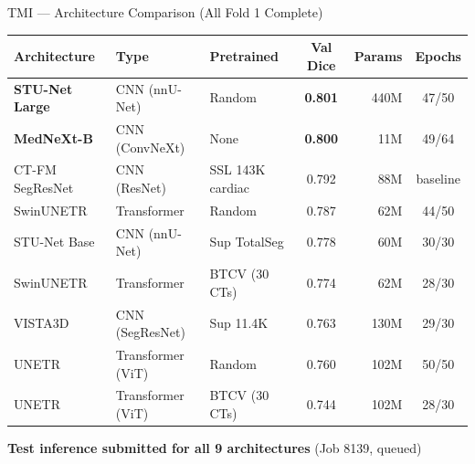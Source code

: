 \documentclass[aspectratio=169,10pt]{beamer}
\newcommand{\good}[1]{\textcolor{green!60!black}{\textbf{#1}}}
\newcommand{\bad}[1]{\textcolor{red!70!black}{#1}}
\begin{document}
\begin{frame}{TMI --- Architecture Comparison (All Fold 1 Complete)}

\centering
\scriptsize
\begin{tabular}{l l l c r c}
\toprule
\textbf{Architecture} & \textbf{Type} & \textbf{Pretrained} & \textbf{Val Dice} & \textbf{Params} & \textbf{Epochs} \\
\midrule
\good{STU-Net Large} & CNN (nnU-Net) & Random & \good{0.801} & 440M & 47/50 \\
\good{MedNeXt-B} & CNN (ConvNeXt) & None & \good{0.800} & 11M & 49/64 \\
CT-FM SegResNet & CNN (ResNet) & SSL 143K cardiac & 0.792 & 88M & baseline \\
SwinUNETR & Transformer & Random & 0.787 & 62M & 44/50 \\
\midrule
STU-Net Base & CNN (nnU-Net) & Sup TotalSeg & 0.778 & 60M & 30/30 \\
SwinUNETR & Transformer & BTCV (30 CTs) & \bad{0.774} & 62M & 28/30 \\
VISTA3D & CNN (SegResNet) & Sup 11.4K & \bad{0.763} & 130M & 29/30 \\
UNETR & Transformer (ViT) & Random & \bad{0.760} & 102M & 50/50 \\
UNETR & Transformer (ViT) & BTCV (30 CTs) & \bad{0.744} & 102M & 28/30 \\
\bottomrule
\end{tabular}

\normalsize
\vspace{0.2cm}
\textbf{Test inference submitted for all 9 architectures} (Job 8139, queued)

\end{frame}
\end{document}
